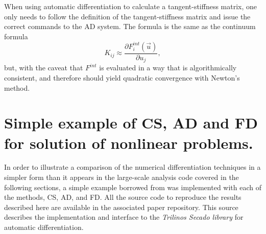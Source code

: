 \documentclass[preprint,12pt]{elsarticle}
\begin{document}
When using automatic differentiation to calculate a tangent-stiffness matrix, one only needs to follow the definition of the tangent-stiffness matrix and issue the correct commands to the AD system. The formula is the same as the continuum formula
%
\begin{equation} K_{ij} \approx \frac{\partial F_i^{int}(\vec{u})}{\partial u_j},
\end{equation}
%
but, with the caveat that $F^{int}$ is evaluated in a way that is algorithmically consistent, and therefore should yield quadratic convergence with Newton's method.

\section{Simple example of CS, AD and FD for solution of nonlinear problems.}
\label{sec:Validation}

In order to illustrate a comparison of the numerical differentiation techniques in a simpler form than it appears in the large-scale analysis code covered in the following sections, a simple example borrowed from \cite{rezaiee2010dynamic} was implemented with each of the methods, CS, AD, and FD. All the source code to reproduce the results described here are available in the associated paper repository. This source describes the implementation and interface to the \emph{Trilinos Secado library} for automatic differentiation.
\end{document}
